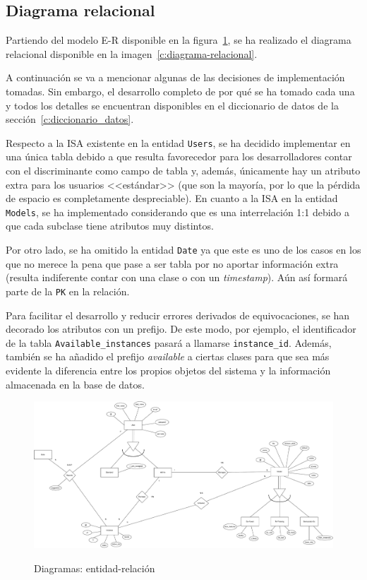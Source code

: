 \subsection{Diagrama relacional}
\label{c:diagrama_relacional}

Partiendo del modelo E-R disponible en la figura~\ref{c:diagrama-er}, se ha realizado el diagrama relacional disponible en la imagen~\ref{c:diagrama-relacional}.

A continuación se va a mencionar algunas de las decisiones de implementación tomadas. Sin embargo, el desarrollo completo de por qué se ha tomado cada una y todos los detalles se encuentran disponibles en el diccionario de datos de la sección~\ref{c:diccionario_datos}.

Respecto a la ISA existente en la entidad \texttt{Users}, se ha decidido implementar en una única tabla debido a que resulta favorecedor para los desarrolladores contar con el discriminante como campo de tabla y, además, únicamente hay un atributo extra para los usuarios <<estándar>> (que son la mayoría, por lo que la pérdida de espacio es completamente despreciable). En cuanto a la ISA en la entidad \texttt{Models}, se ha implementado considerando que es una interrelación 1:1 debido a que cada subclase tiene atributos muy distintos.

Por otro lado, se ha omitido la entidad \texttt{Date} ya que este es uno de los casos en los que no merece la pena que pase a ser tabla por no aportar información extra (resulta indiferente contar con una clase o con un \textit{timestamp}). Aún así formará parte de la \texttt{PK} en la relación.

Para facilitar el desarrollo y reducir errores derivados de equivocaciones, se han decorado los atributos con un prefijo. De este modo, por ejemplo, el identificador de la tabla \texttt{Available\_instances} pasará a llamarse \texttt{instance\_id}. Además, también se ha añadido el prefijo \textit{available} a ciertas clases para que sea más evidente la diferencia entre los propios objetos del sistema y la información almacenada en la base de datos.


\begin{landscape}
\begin{figure}[h]
	\caption{Diagramas: entidad-relación}
	\centering
	\includegraphics[scale=0.4]{../img/anexos/diagrams/er}
	\label{c:diagrama-er}
\end{figure}
\end{landscape}

